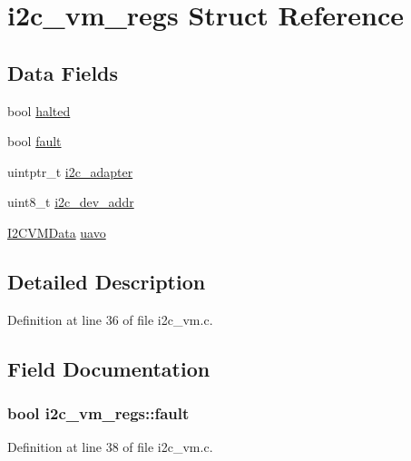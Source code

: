 \hypertarget{structi2c__vm__regs}{\section{i2c\-\_\-vm\-\_\-regs \-Struct \-Reference}
\label{structi2c__vm__regs}
}
\subsection*{\-Data \-Fields}
\begin{DoxyCompactItemize}
\item 
bool \hyperlink{structi2c__vm__regs_aa3c803fa05ab57a838ae6b617d34482e}{halted}
\item 
bool \hyperlink{structi2c__vm__regs_ae7015bac5741e377b8bcb8b2d8df9e82}{fault}
\item 
uintptr\-\_\-t \hyperlink{structi2c__vm__regs_a70b3400858879a31d7a1a032f6b2807e}{i2c\-\_\-adapter}
\item 
uint8\-\_\-t \hyperlink{structi2c__vm__regs_a3f919c5ae80615db316bec29bd0d1156}{i2c\-\_\-dev\-\_\-addr}
\item 
\hyperlink{struct_i2_c_v_m_data}{\-I2\-C\-V\-M\-Data} \hyperlink{structi2c__vm__regs_a7c478bf7f2b9d2dc1501e92e1368b69e}{uavo}
\end{DoxyCompactItemize}


\subsection{\-Detailed \-Description}


\-Definition at line 36 of file i2c\-\_\-vm.\-c.



\subsection{\-Field \-Documentation}
\hypertarget{structi2c__vm__regs_ae7015bac5741e377b8bcb8b2d8df9e82}{
\subsubsection[{fault}]{\setlength{\rightskip}{0pt plus 5cm}bool {\bf i2c\-\_\-vm\-\_\-regs\-::fault}}}\label{structi2c__vm__regs_ae7015bac5741e377b8bcb8b2d8df9e82}


\-Definition at line 38 of file i2c\-\_\-vm.\-c.

